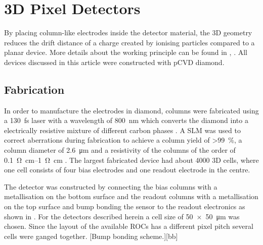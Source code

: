\section{3D Pixel Detectors}
By placing column-like electrodes inside the detector material, the 3D geometry reduces the drift distance of a charge created by ionising particles compared to a planar device. More details about the working principle can be found in \cite{parker}, \cite{3D}. All devices discussed in this article were constructed with \ac{pCVD} diamond.
\subsection{Fabrication}
In order to manufacture the electrodes in diamond, columns were fabricated using a \SI{130}{\femto\second} laser with a wavelength of \SI{800}{\nano\meter} which converts the diamond into a electrically resistive mixture of different carbon phases \cite{3dfab}. A \ac{SLM} was used to correct aberrations during fabrication to achieve a column yield of \SI{>99}{\%}, a column diameter of \SI{2.6}{\micro\meter} and a resistivity of the columns of the order of \SIrange{.1}{1}{\ohm\centi\meter} \cite{slm}. The largest fabricated device had about 4000 3D cells, where one cell consists of four bias electrodes and one readout electrode in the centre. \par
The detector was constructed by connecting the bias columns with a metallisation on the bottom surface and the readout columns with a metallisation on the top surface and bump bonding the sensor to the readout electronics as shown in . For the detectors described herein a cell size of \SI{50x50}{\micro\meter} was chosen. Since the layout of the available \acp{ROC} has a different pixel pitch several cells were ganged together.
[Bump bonding scheme.][bb]
